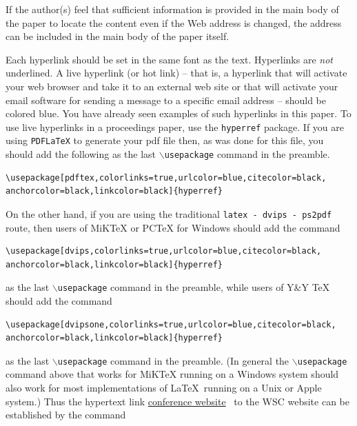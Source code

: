 \documentclass{article}
\begin{document}
If the author(s) feel that sufficient information is provided in the main body of the paper to locate the content even if the Web address is changed, the address can be included in the main body of the paper itself.

Each hyperlink should be set in the same font as the text.
Hyperlinks are {\em not} underlined.
A live hyperlink (or hot link) -- that is, a hyperlink that will activate your web browser and take it to an external web site or that will activate your email software for sending a message to a specific email address -- should be colored blue. You have already seen examples of such hyperlinks in this paper.
To use live hyperlinks in a proceedings paper, use the {\tt hyperref} package. If you are using {\tt PDFLaTeX} to generate your pdf file then, as
was done for this file, you should add the following as the last {\tt $\backslash$usepackage} command in the preamble.\newline


\begin{verbatim}
\usepackage[pdftex,colorlinks=true,urlcolor=blue,citecolor=black,
anchorcolor=black,linkcolor=black]{hyperref}
\end{verbatim}\vspace{5 mm}

\noindent On the other hand, if you are using the traditional {\tt latex - dvips - ps2pdf} route, then users of MiKTeX or PCTeX for Windows should add the command\newline


\begin{verbatim}
\usepackage[dvips,colorlinks=true,urlcolor=blue,citecolor=black,
anchorcolor=black,linkcolor=black]{hyperref}
\end{verbatim}\vspace{5 mm}


\noindent as the last {\tt $\backslash$usepackage} command in the preamble, while users of Y\&Y TeX should add the command\newline


\begin{verbatim}
\usepackage[dvipsone,colorlinks=true,urlcolor=blue,citecolor=black,
anchorcolor=black,linkcolor=black]{hyperref}
\end{verbatim}\vspace{5 mm}


\noindent as the last {\tt $\backslash$usepackage} command in the preamble.
(In general the {\tt $\backslash$usepackage} command above that works for MiKTeX running on a Windows system should also work for most implementations of \LaTeX\ running on a Unix or Apple system.)
Thus the hypertext link \href{http://www.wintersim.org}{conference website}~\cite{WSC} to the WSC website can be established by the command\newline
\end{document}
